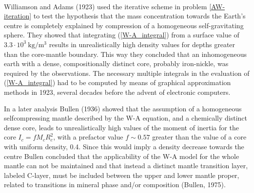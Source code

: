 
\vspace{0.5cm}

~\\
Williamson and Adams (1923) \cite{wiad23} used the iterative scheme 
in problem \ref{AW-iteration}
to test the hypothesis
that the mass concentration towards the Earth's centre is 
completely explained by 
compression of a homogeneous self-gravitating sphere.
They showed that integrating (\ref{W-A_integral}) from a surface value
of $3.3\cdot 10^3~\mathrm{kg/m^3}$ results in unrealistically 
high density values for 
depths greater than the core-mantle boundary.
This way they concluded that an inhomogeneous earth with a dense,
compositionally distinct core, probably iron-nickle, was required by
the observations.
The necessary multiple integrals in the evaluation of 
(\ref{W-A_integral})
had to be computed by means of graphical approximation methods in 1923,
several decades before the advent of electronic computers.

In a later analysis Bullen (1936) showed that the assumption of 
a homogeneous selfcompressing mantle described by the 
W-A equation,
and a chemically distinct dense core,
leads to unrealistically high values of the moment of 
inertia for the core
$I_c = f M_c R_c^2$, with a prefactor value $f\sim 0.57$ greater
than the value of a core with uniform density, 0.4.    
Since this would imply a density decrease towards the centre Bullen
concluded that the applicability of the W-A model for the whole mantle 
can not be maintained and that instead a distinct mantle transition layer, 
labeled C-layer,
must be included between the upper and lower mantle proper,
related to transitions in mineral phase and/or composition
(Bullen, 1975).

